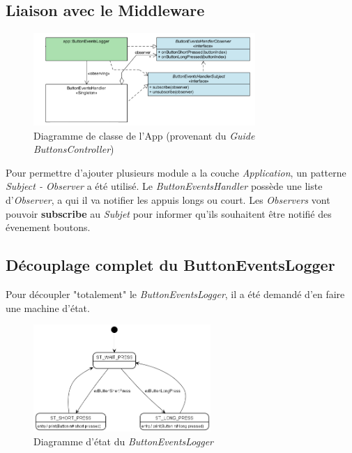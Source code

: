 \subsection{Liaison avec le Middleware}
\begin{figure}[H]
    \centering
    \includegraphics[width=0.75\textwidth]{Images/buttons/app_layer.PNG}
    \caption[Full UML]{Diagramme de classe de l'App (provenant du \emph{Guide ButtonsController}\footnotemark[1])}
\end{figure}
Pour permettre d'ajouter plusieurs module a la couche \emph{Application},
un patterne \emph{Subject - Observer} a été utilisé.
Le \emph{ButtonEventsHandler} possède une liste d'\emph{Observer}, a qui il
va notifier les appuis longs ou court. Les \emph{Observers} vont pouvoir
\textbf{subscribe} au \emph{Subjet} pour informer qu'ils souhaitent être notifié
des évenement boutons.
\subsection{Découplage complet du ButtonEventsLogger}
Pour découpler "totalement" le \emph{ButtonEventsLogger}, il a été demandé
d'en faire une machine d'état.
\begin{figure}[H]
    \centering
    \includegraphics[width=0.6\textwidth]{Images/buttons/ButtonEventsLogger.png}
    \caption[Full UML]{Diagramme d'état du \emph{ButtonEventsLogger}}
\end{figure}\newpage

